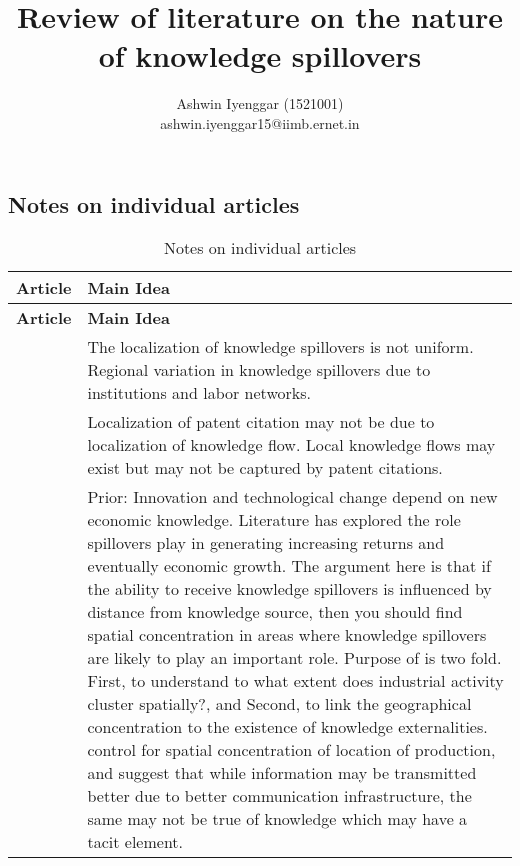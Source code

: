 \documentclass[12pt]{article}
\begin{document}
\title{\LARGE Review of literature on the nature of knowledge spillovers}
\date{}
\author{Ashwin Iyenggar  (1521001) \\ ashwin.iyenggar15@iimb.ernet.in} 
\large

\maketitle
\thispagestyle{empty}

\onehalfspacing



\begin{center}
\section*{Notes on individual articles}
 \begin{longtable}{|p{}|p{}|}
 \caption{Notes on individual articles\label{long}}\\
 
 \hline\textbf{Article}&\textbf{Main Idea}\\\hline
 \endfirsthead
 
 \hline\textbf{Article}&\textbf{Main Idea}\\\hline
 \endhead
 
 \hline
 \endfoot
 
 \hline
 \endlastfoot

\cite*{Almeida1999} & The localization of knowledge spillovers is not uniform. Regional variation in knowledge spillovers due to institutions and labor networks.\\\hline
\cite*{Arora2017a} & Localization of patent citation may not be due to localization of knowledge flow. Local knowledge flows may exist but may not be captured by patent citations.\\\hline

\cite*{Audretsch1996a} & Prior: Innovation and technological change depend on new economic knowledge. Literature has explored the role spillovers play in generating increasing returns and eventually economic growth. The argument here is that if the ability to receive knowledge spillovers is influenced by distance from knowledge source, then you should find spatial concentration in areas where knowledge spillovers are likely to play an important role. Purpose of \cite*{Audretsch1996a} is two fold. First, to understand to what extent does industrial activity cluster spatially?, and Second, to link the geographical concentration to the existence of knowledge externalities. \cite*{Audretsch1996a} control for spatial concentration of location of production, and suggest that while information may be transmitted better due to better communication infrastructure, the same may not be true of knowledge which may have a tacit element. \\\hline


\end{longtable}
\end{center}
\end{document}
